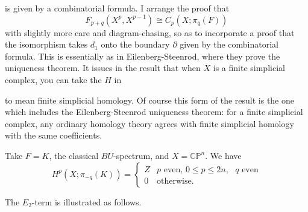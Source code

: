 \documentclass[../main]{subfiles}
\begin{document}
\begin{enumerate}
    \begin{center}
    \end{center}
    is given by a combinatorial formula. I arrange the proof that
    \begin{equation*}
        F_{p+q}(X^p,X^{p-1})\cong C_p(X;\pi_q(F))
    \end{equation*}
    with slightly more care and diagram-chasing, so as to incorporate a proof that the isomorphism takes $d_1$ onto the boundary $\partial$ given by the combinatorial formula. This is essentially as in Eilenberg-Steenrod, where they prove the uniqueness theorem. It issues in the result that when $X$ is a finite simplicial complex, you can take the $H$ in 
    \begin{center}
    \end{center}
    to mean finite simplicial homology. Of course this form of the result is the one which includes the Eilenberg-Steenrod uniqueness theorem: for a finite simplicial complex, any ordinary homology theory agrees with finite simplicial homology with the same coefficients.
\end{enumerate}


\begin{examples}
Take $F=K$, the classical $BU$-spectrum, and $X=\mathbb{CP}^n$. We have 
\begin{equation*}
    H^p(X;\pi_{-q}(K))=
    \begin{cases}
    Z&p\text{ even, }0\leq p\leq 2n,\text{ }q\text{ even}\\
    0&\text{otherwise.}
    \end{cases}
\end{equation*}
\end{examples}
The $E_2$-term is illustrated as follows.
\end{document}
